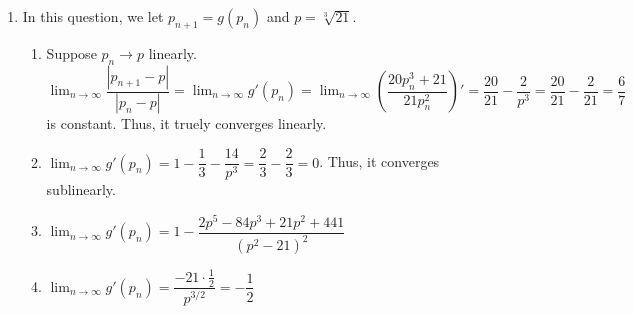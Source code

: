 \documentclass[12pt]{article}
\begin{document}
\begin{enumerate}
    \item In this question, we let $p_{n+1} = g(p_n)$ and $p = \sqrt[3]{21}$.
    
    \begin{enumerate}
        \item Suppose $p_n\to p$ linearly. 
        $\displaystyle\lim_{n\to\infty} \dfrac{|p_{n+1} - p|}{|p_n - p|} = \displaystyle\lim_{n\to\infty} g'(p_n) = \displaystyle\lim_{n\to\infty} (\dfrac{20p_n^3 + 21}{21p_n^2})' = \dfrac{20}{21} - \dfrac{2}{p^3} = \dfrac{20}{21} - \dfrac{2}{21} = \dfrac{6}{7}$ is constant.
        Thus, it truely converges linearly.

        \item $\displaystyle\lim_{n\to\infty} g'(p_n) = 1 - \dfrac{1}{3} - \dfrac{14}{p^3} = \dfrac{2}{3} - \dfrac{2}{3} = 0$.
        Thus, it converges sublinearly.

        \item $\displaystyle\lim_{n\to\infty} g'(p_n) = 1 - \dfrac{2p^5 - 84p^3 + 21p^2 + 441}{(p^2-21)^2}$

        \item $\displaystyle\lim_{n\to\infty} g'(p_n) = \dfrac{-21\cdot \frac{1}{2}}{p^{3/2}} = -\dfrac{1}{2}$
    \end{enumerate}
\end{enumerate}
\end{document}
